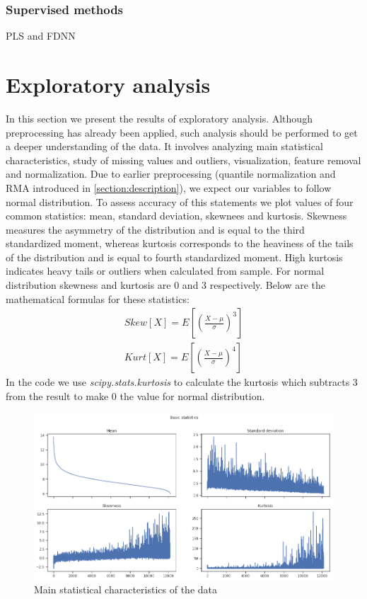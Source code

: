 \documentclass[12pt, wide]{mwart}
\begin{document}
\subsubsection{Supervised methods}
PLS and FDNN




\section{Exploratory analysis}

In this section we present the results of exploratory analysis. Although preprocessing has already been applied, such analysis should be performed to get a deeper understanding of the data. It involves analyzing main statistical characteristics, study of missing values and outliers, visualization, feature removal and normalization. Due to earlier preprocessing (quantile normalization and RMA introduced in \ref{section:description}), we expect our variables to follow normal distribution. To assess accuracy of this statements we plot values of four common statistics: mean, standard deviation, skewnees and kurtosis. Skewness measures the asymmetry of the distribution and is equal to the third standardized moment, whereas kurtosis corresponds to the heaviness of the tails of the distribution and is equal to fourth standardized moment. High kurtosis indicates heavy tails or outliers when calculated from sample. For normal distribution skewness and kurtosis are $0$ and $3$ respectively. Below are the mathematical formulas for these statistics:
\begin{align}
    Skew[X] = E\left[\left(\frac{X-\mu}{\sigma}\right)^3 \right] \nonumber \\
    Kurt[X] = E\left[\left(\frac{X-\mu}{\sigma}\right)^4 \right] \nonumber
\end{align}
In the code we use \textit{scipy.stats.kurtosis} to calculate the kurtosis which subtracts $3$ from the result to make $0$ the value for normal distribution. 

\begin{figure}
\centering
\includegraphics[width=\textwidth]{images/basic_stats.png}
\caption{Main statistical characteristics of the data}
\label{fig:stats}
\end{figure}
\end{document}
